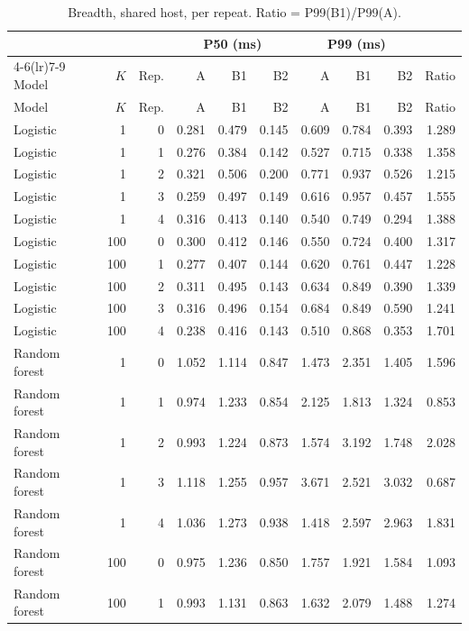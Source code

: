 \documentclass[10pt,a4paper]{article}
\begin{document}
\begin{longtable}{lrrrrrrrrr}
\caption{Breadth, shared host, per repeat. Ratio = P99(B1)/P99(A).}\label{tab:ext_rep}\\
\toprule
 & & & \multicolumn{3}{c}{P50 (ms)} & \multicolumn{3}{c}{P99 (ms)} & \\
\cmidrule(lr){4-6}\cmidrule(lr){7-9}
Model & $K$ & Rep. & A & B1 & B2 & A & B1 & B2 & Ratio \\
\midrule
\endfirsthead
\toprule
Model & $K$ & Rep. & A & B1 & B2 & A & B1 & B2 & Ratio \\
\midrule
\endhead
Logistic & 1 & 0 & 0.281 & 0.479 & 0.145 & 0.609 & 0.784 & 0.393 & 1.289 \\
Logistic & 1 & 1 & 0.276 & 0.384 & 0.142 & 0.527 & 0.715 & 0.338 & 1.358 \\
Logistic & 1 & 2 & 0.321 & 0.506 & 0.200 & 0.771 & 0.937 & 0.526 & 1.215 \\
Logistic & 1 & 3 & 0.259 & 0.497 & 0.149 & 0.616 & 0.957 & 0.457 & 1.555 \\
Logistic & 1 & 4 & 0.316 & 0.413 & 0.140 & 0.540 & 0.749 & 0.294 & 1.388 \\
Logistic & 100 & 0 & 0.300 & 0.412 & 0.146 & 0.550 & 0.724 & 0.400 & 1.317 \\
Logistic & 100 & 1 & 0.277 & 0.407 & 0.144 & 0.620 & 0.761 & 0.447 & 1.228 \\
Logistic & 100 & 2 & 0.311 & 0.495 & 0.143 & 0.634 & 0.849 & 0.390 & 1.339 \\
Logistic & 100 & 3 & 0.316 & 0.496 & 0.154 & 0.684 & 0.849 & 0.590 & 1.241 \\
Logistic & 100 & 4 & 0.238 & 0.416 & 0.143 & 0.510 & 0.868 & 0.353 & 1.701 \\
Random forest & 1 & 0 & 1.052 & 1.114 & 0.847 & 1.473 & 2.351 & 1.405 & 1.596 \\
Random forest & 1 & 1 & 0.974 & 1.233 & 0.854 & 2.125 & 1.813 & 1.324 & 0.853 \\
Random forest & 1 & 2 & 0.993 & 1.224 & 0.873 & 1.574 & 3.192 & 1.748 & 2.028 \\
Random forest & 1 & 3 & 1.118 & 1.255 & 0.957 & 3.671 & 2.521 & 3.032 & 0.687 \\
Random forest & 1 & 4 & 1.036 & 1.273 & 0.938 & 1.418 & 2.597 & 2.963 & 1.831 \\
Random forest & 100 & 0 & 0.975 & 1.236 & 0.850 & 1.757 & 1.921 & 1.584 & 1.093 \\
Random forest & 100 & 1 & 0.993 & 1.131 & 0.863 & 1.632 & 2.079 & 1.488 & 1.274 \\

\end{longtable}
\end{document}
